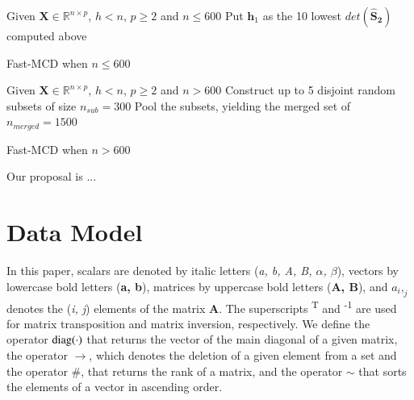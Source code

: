 \documentclass[review]{elsarticle}
\begin{document}
\begin{algorithm}
	\label{alg:alg03}
	\scriptsize
	\SetAlgoLined
	Given $\boldsymbol{X} \in \mathbb{R}^{n \times p}$, $h < n$, $p \geq 2$ and $n \leq 600$\;
	Put $\boldsymbol{h}_1$ as the 10 lowest $det(\boldsymbol{\hat{S}_2})$ computed above\;
	\caption{Fast-MCD when $n \leq 600$}
\end{algorithm}

\begin{algorithm}
	\label{alg:alg04}
	\scriptsize
	\SetAlgoLined
	Given $\boldsymbol{X} \in \mathbb{R}^{n \times p}$, $h < n$, $p \geq 2$ and $n > 600$\;
	Construct up to 5 disjoint random subsets of size $n_{sub} = 300$\;
	Pool the subsets, yielding the merged set of $n_{merged} = 1500$\;
	\caption{Fast-MCD when $n > 600$}
\end{algorithm}

Our proposal is ...

\section{Data Model}
\label{sec:datamodel}

In this paper, scalars are denoted by italic letters (\emph{a, b, A, B, $α$, $β$}), vectors by lowercase bold letters (\textbf{a, b}), matrices by uppercase bold letters (\textbf{A, B}), and $a_i,_j$ denotes the (\emph{i, j}) elements of the matrix \textbf{A}. The superscripts \textsuperscript{T} and \textsuperscript{-1} are used for matrix transposition and matrix inversion, respectively. We define the operator $\rm diag(\cdot)$ that returns the vector of the main diagonal of a given matrix, the operator $\rightarrow$, which denotes the deletion of a given element from a set and the operator $\#$, that returns the rank of a matrix, and the operator $\sim$ that sorts the elements of a vector in ascending order.
\end{document}
